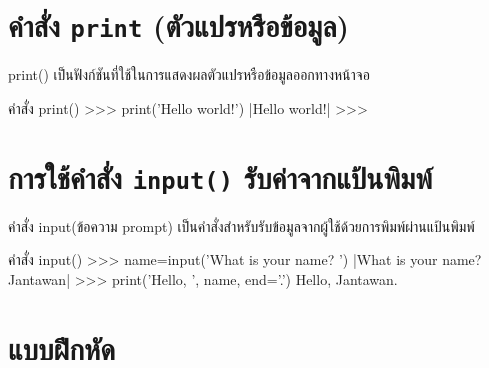 \section{คำสั่ง \texttt{print} (ตัวแปรหรือข้อมูล)}

print() เป็นฟังก์ชันที่ใช้ในการแสดงผลตัวแปรหรือข้อมูลออกทางหน้าจอ 

\begin{codelist}{คำสั่ง print()}{}
>>> print('Hello world!')
|Hello world!|
>>>
\end{codelist}


\section{การใช้คำสั่ง \texttt{input()} รับค่าจากแป้นพิมพ์}

คำสั่ง input(ข้อความ prompt) เป็นคำสั่งสำหรับรับข้อมูลจากผู้ใช้ด้วยการพิมพ์ผ่านแป้นพิมพ์ 

\begin{codelist}{คำสั่ง input()}{}
>>> name=input('What is your name? ')
|What is your name? Jantawan|
>>> print('Hello, ', name, end='.')
Hello, Jantawan.
\end{codelist}


\section{แบบฝึกหัด}


